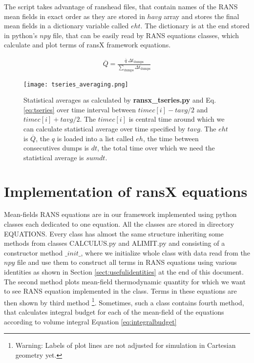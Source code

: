 \documentclass[11pt,paper=a4]{report}
\begin{document}
The script takes advantage of ranshead files, that contain names of the RANS mean fields in exact order as they are stored in $havg$ array and stores the final mean fields in a dictionary variable called $eht$. The dictionary is at the end stored in python's $npy$ file, that can be easily read by RANS equations classes, which calculate and plot terms of ransX framework equations.

\begin{align}
  \overline{Q} = \frac{\overline{q} \ \Delta t_{\mbox{dumps}}}{\sum_{\mbox{dumps}} \Delta t_{\mbox{dumps}}}
\label{eq:tseries}  
\end{align}

\begin{figure}[!h]
\centerline{
\texttt{[image: tseries\_averaging.png]}}
\caption{Statistical averages as calculated by {\bf ransx\_tseries.py} and Eq.\ref{eq:tseries} over time interval between $timec[i]-tavg/2$ and $timec[i]+tavg/2$. The $timec[i]$ is central time around which we can calculate statistical average over time specified by $tavg$. The $eht$ is $\overline{Q}$, the $q$ is loaded into a list called $eh$, the time between consecutives dumps is $dt$, the total time over which we need the statistical average is $sumdt$.}
\label{fig:tseries}
\end{figure}

\section{Implementation of ransX equations}

Mean-fields RANS equations are in our framework implemented using python classes each dedicated to one equation. All the classes are stored in directory EQUATIONS. Every class has almost the same structure inheriting some methods from classes CALCULUS.py and ALIMIT.py and consisting of a constructor method $\_init\_$, where we initialize whole class with data read from the $npy$ file and use them to construct all terms in RANS equations using various identities as shown in Section \ref{sect:usefulidentities} at the end of this document. The second method plots mean-field thermodynamic quantity for which we want to see RANS equation implemented in the class. Terms in these equations are then shown by third method \footnote{Warning: Labels of plot lines are not adjusted for simulation in Cartesian geometry yet.}. Sometimes, such a class contains fourth method, that calculates integral budget for each of the mean-field of the equations according to volume integral Equation \ref{eq:integralbudget}
\end{document}

